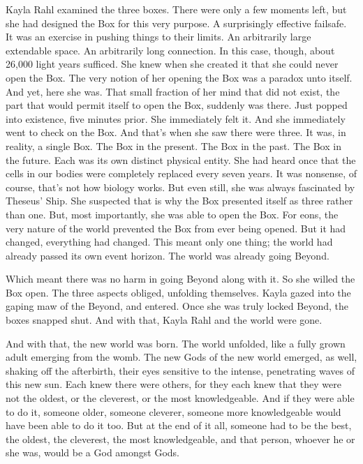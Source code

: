 Kayla Rahl examined the three boxes. There were only a few moments left, but she had designed the Box for this very purpose. A surprisingly effective failsafe.\\It was an exercise in pushing things to their limits. An arbitrarily large extendable space. An arbitrarily long connection. In this case, though, about 26,000 light years sufficed.
\SmallVSpace
She knew when she created it that she could never open the Box. The very notion of her opening the Box was a paradox unto itself. And yet, here she was. That small fraction of her mind that did not exist, the part that would permit itself to open the Box, suddenly was there. Just popped into existence, five minutes prior.
\SmallVSpace
She immediately felt it. And she immediately went to check on the Box. And that’s when she saw there were three. It was, in reality, a single Box. The Box in the present. The Box in the past. The Box in the future. Each was its own distinct physical entity. She had heard once that the cells in our bodies were completely replaced every seven years. It was nonsense, of course, that’s not how biology works. But even still, she was always fascinated by Theseus’ Ship. She suspected that is why the Box presented itself as three rather than one.
\SmallVSpace
But, most importantly, she was able to open the Box. For eons, the very nature of the world prevented the Box from ever being opened. But it had changed, everything had changed. This meant only one thing; the world had already passed its own event horizon. The world was already going Beyond.

Which meant there was no harm in going Beyond along with it.
\SmallVSpace
So she willed the Box open. The three aspects obliged, unfolding themselves. Kayla gazed into the gaping maw of the Beyond, and entered.
\SmallVSpace
Once she was truly locked Beyond, the boxes snapped shut.
\SmallVSpace
And with that, Kayla Rahl and the world were gone.
\simpleline

And with that, the new world was born.
\SomeVSpace
The world unfolded, like a fully grown adult emerging from the womb. The new Gods of the new world emerged, as well, shaking off the afterbirth, their eyes sensitive to the intense, penetrating waves of this new sun.
\SmallVSpace
Each knew there were others, for they each knew that they were not the oldest, or the cleverest, or the most knowledgeable. And if they were able to do it, someone older, someone cleverer, someone more knowledgeable would have been able to do it too.
\SmallVSpace
But at the end of it all, someone had to be the best, the oldest, the cleverest, the most knowledgeable, and that person, whoever he or she was, would be a God amongst Gods.